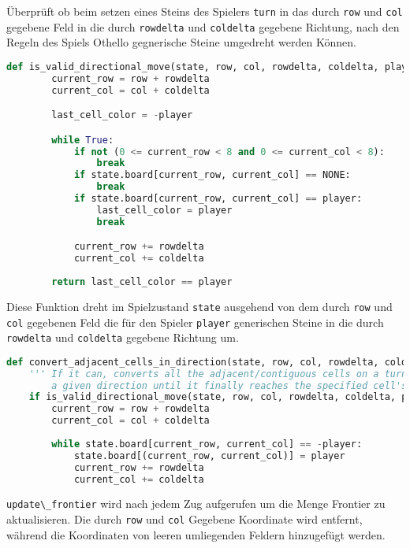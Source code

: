 Überprüft ob beim setzen eines Steins des Spielers
\passthrough{\lstinline!turn!} in das durch
\passthrough{\lstinline!row!} und \passthrough{\lstinline!col!} gegebene
Feld in die durch \passthrough{\lstinline!rowdelta!} und
\passthrough{\lstinline!coldelta!} gegebene Richtung, nach den Regeln
des Spiels Othello gegnerische Steine umgedreht werden Können.

\begin{lstlisting}[language=Python]
def is_valid_directional_move(state, row, col, rowdelta, coldelta, player):
        current_row = row + rowdelta
        current_col = col + coldelta

        last_cell_color = -player

        while True:
            if not (0 <= current_row < 8 and 0 <= current_col < 8):
                break
            if state.board[current_row, current_col] == NONE:
                break           
            if state.board[current_row, current_col] == player:
                last_cell_color = player
                break

            current_row += rowdelta
            current_col += coldelta
            
        return last_cell_color == player
\end{lstlisting}

Diese Funktion dreht im Spielzustand \passthrough{\lstinline!state!}
ausgehend von dem durch \passthrough{\lstinline!row!} und
\passthrough{\lstinline!col!} gegebenen Feld die für den Spieler
\passthrough{\lstinline!player!} generischen Steine in die durch
\passthrough{\lstinline!rowdelta!} und
\passthrough{\lstinline!coldelta!} gegebene Richtung um.

\begin{lstlisting}[language=Python]
def convert_adjacent_cells_in_direction(state, row, col, rowdelta, coldelta, player):
    ''' If it can, converts all the adjacent/contiguous cells on a turn in
        a given direction until it finally reaches the specified cell's original color '''
    if is_valid_directional_move(state, row, col, rowdelta, coldelta, player):
        current_row = row + rowdelta
        current_col = col + coldelta
        
        while state.board[current_row, current_col] == -player:
            state.board[(current_row, current_col)] = player
            current_row += rowdelta
            current_col += coldelta
\end{lstlisting}

\passthrough{\lstinline!update\_frontier!} wird nach jedem Zug
aufgerufen um die Menge Frontier zu aktualisieren. Die durch
\passthrough{\lstinline!row!} und \passthrough{\lstinline!col!} Gegebene
Koordinate wird entfernt, während die Koordinaten von leeren umliegenden
Feldern hinzugefügt werden.

